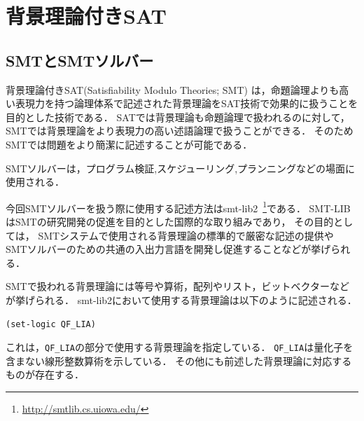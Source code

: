 \chapter{背景理論付きSAT}\label{chap:smt}

%
%
\section{SMTとSMTソルバー}
背景理論付きSAT(Satisfiability Modulo Theories; SMT)\cite{JSAI:IwanumaN10, Umemura10:jssst, weko_169448_1}
は，命題論理よりも高い表現力を持つ論理体系で記述された背景理論をSAT技術で効果的に扱うことを目的とした技術である．
SATでは背景理論も命題論理で扱われるのに対して，SMTでは背景理論をより表現力の高い述語論理で扱うことができる．
そのためSMTでは問題をより簡潔に記述することが可能である．

%
%
SMTソルバーは，プログラム検証,スケジューリング,プランニングなどの場面に使用される．


今回SMTソルバーを扱う際に使用する記述方法はsmt-lib2~\footnote{\url{http://smtlib.cs.uiowa.edu/}}である．
SMT-LIBはSMTの研究開発の促進を目的とした国際的な取り組みであり，
その目的としては，
SMTシステムで使用される背景理論の標準的で厳密な記述の提供や
SMTソルバーのための共通の入出力言語を開発し促進することなどが挙げられる．




SMTで扱われる背景理論には等号や算術，配列やリスト，ビットベクターなどが挙げられる．
smt-lib2において使用する背景理論は以下のように記述される．
{\footnotesize \begin{verbatim}
(set-logic QF_LIA)
\end{verbatim}}
これは，\verb|QF_LIA|の部分で使用する背景理論を指定している．
\verb|QF_LIA|は量化子を含まない線形整数算術を示している．
その他にも前述した背景理論に対応するものが存在する．


